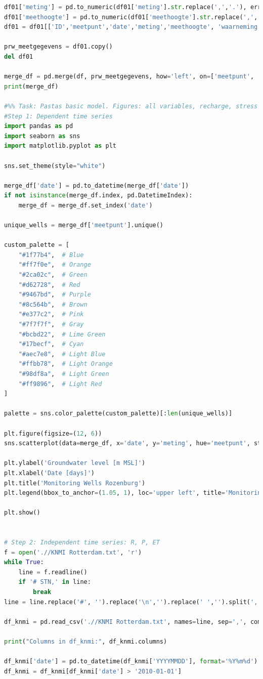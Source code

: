\begin{lstlisting}[language=Python]
df01['meting'] = pd.to_numeric(df01['meting'].str.replace(',','.'), errors='coerce') 
df01['meethoogte'] = pd.to_numeric(df01['meethoogte'].str.replace(',','.'), errors='coerce') 
df01 = df01[['ID','meetpunt','date','meting','meethoogte', 'waarneming']]

prw_meetgegevens = df01.copy()
del df01

merge_df = pd.merge(df, prw_meetgegevens, how='left', on=['meetpunt', 'date', 'meting'])
print(merge_df)

#%% Task: Pastas basic model. Figures: all variables, recharge, stress models. 
#Step 1: Dependent time series 
import pandas as pd
import seaborn as sns
import matplotlib.pyplot as plt

sns.set_theme(style="white")

merge_df['date'] = pd.to_datetime(merge_df['date'])
if not isinstance(merge_df.index, pd.DatetimeIndex):
    merge_df = merge_df.set_index('date')

unique_wells = merge_df['meetpunt'].unique()

custom_palette = [
    "#1f77b4",  # Blue
    "#ff7f0e",  # Orange
    "#2ca02c",  # Green
    "#d62728",  # Red
    "#9467bd",  # Purple
    "#8c564b",  # Brown
    "#e377c2",  # Pink
    "#7f7f7f",  # Gray
    "#bcbd22",  # Lime Green
    "#17becf",  # Cyan
    "#aec7e8",  # Light Blue
    "#ffbb78",  # Light Orange
    "#98df8a",  # Light Green
    "#ff9896",  # Light Red
]

palette = sns.color_palette(custom_palette)[:len(unique_wells)]

plt.figure(figsize=(12, 6))
sns.scatterplot(data=merge_df, x='date', y='meting', hue='meetpunt', style='meetpunt', markers=True, s=20, palette=palette)

plt.ylabel('Groundwater level [m MSL]')
plt.xlabel('Date [days]')
plt.title('Monitoring Wells Rozenburg')
plt.legend(bbox_to_anchor=(1.05, 1), loc='upper left', title='Monitoring Well')

plt.show()


# Step 2: Independent time series: R, P, ET
f = open('.//KNMI Rotterdam.txt', 'r')
while True: 
    line = f.readline()
    if '# STN,' in line: 
        break 
line = line.replace('#', '').replace('\n','').replace(' ','').split(',')

df_knmi = pd.read_csv('.//KNMI Rotterdam.txt', names=line, sep=',', comment='#')

print("Columns in df_knmi:", df_knmi.columns)

df_knmi['date'] = pd.to_datetime(df_knmi['YYYYMMDD'], format='%Y%m%d')
df_knmi = df_knmi[df_knmi['date'] > '2010-01-01']


\end{lstlisting}
